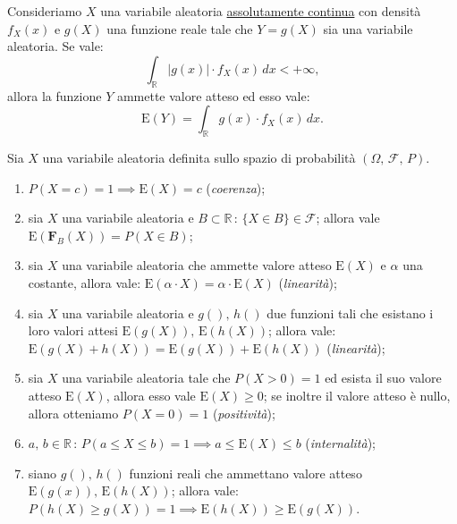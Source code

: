         \begin{defn}[continua]
            Consideriamo $X$ una variabile aleatoria \underline{assolutamente continua} con densità $f_X(x)$ e $g(X)$ una funzione reale tale che $Y = g(X)$ sia una variabile aleatoria.
            Se vale: \[
                \int_{\mathbb{R}} \left|g(x)\right| \cdot f_X(x)\, dx < +\infty
            ,\] allora la funzione $Y$ ammette valore atteso ed esso vale:
            \begin{equation}\label{eq:Valore_atteso_funzione_continua}
                \text{E}(Y) = \int_{\mathbb{R}} g(x) \cdot f_X(x)\, dx
            .\end{equation}
        \end{defn}
        \begin{prty}\label{prty:Valore_atteso}
            Sia $X$ una variabile aleatoria definita sullo spazio di probabilità $(\Omega,\,\mathscr{F},\,P)$.
            \begin{enumerate}
                \item $P(X = c) = 1 \implies \text{E}(X) = c$ (\emph{coerenza});\label{itm:Coerenza_valore_atteso}
                \item sia $X$ una variabile aleatoria e $B \subset \mathbb{R} \,:\, \{X \in B\} \in \mathscr{F}$; allora vale $\text{E}(\mathbf{F}_B(X)) = P(X \in B)$;
                \item sia $X$ una variabile aleatoria che ammette valore atteso $\text{E}(X)$ e $\alpha$ una costante, allora vale: $\text{E}(\alpha \cdot X) = \alpha \cdot \text{E}(X)$ (\emph{linearità});\label{itm:Linearità_valore_atteso_prodotto}
                \item sia $X$ una variabile aleatoria e $g(),\, h()$ due funzioni tali che esistano i loro valori attesi $\text{E}(g(X)),\, \text{E}(h(X))$; allora vale: $\text{E}(g(X)+h(X)) = \text{E}(g(X)) + \text{E}(h(X))$ (\emph{linearità});\label{itm:Linearità_valore_atteso_somma}
                \item sia $X$ una variabile aleatoria tale che $P(X > 0) = 1$ ed esista il suo valore atteso $\text{E}(X)$, allora esso vale $\text{E}(X) \geq 0$; se inoltre il valore atteso è nullo, allora otteniamo $P(X = 0) = 1$ (\emph{positività});\label{itm:Positività_valore_atteso}
                \item $a,\,b \in \mathbb{R} \,:\, P(a \leq X \leq b) = 1 \implies a \leq \text{E}(X) \leq b$ (\emph{internalità});\label{itm:Internalità_valore_atteso}
                \item siano $g(),\,h()$ funzioni reali che ammettano valore atteso $\text{E}(g(x)),\,\text{E}(h(X))$; allora vale: $P(h(X) \geq g(X)) = 1 \implies \text{E}(h(X)) \geq \text{E}(g(X))$.
            \end{enumerate}
        \end{prty}
